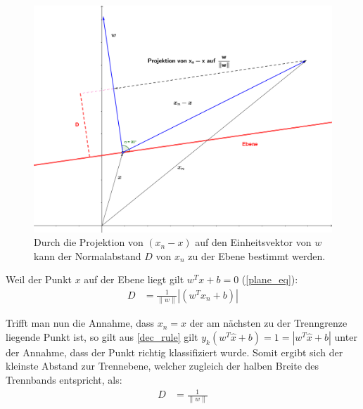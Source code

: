 \documentclass[a4paper,11pt,twoside]{scrreprt}
\newcommand{\norm}[1]{\lVert#1\rVert}
\begin{document}
\begin{figure}[H]
	\centering
	\includegraphics[width = 13cm]{assets/projection.png}
	\caption{Durch die Projektion von $(x_{n} - x)$ auf den Einheitsvektor von $w$ kann der Normalabstand $D$ von $x_{n}$ zu der Ebene bestimmt werden.}
	\label{fig:projection}
\end{figure}

Weil der Punkt $x$ auf der Ebene liegt gilt $w^{T} x + b = 0$ (\autoref{plane_eq}):
\begin{equation} \label{distance_to_plane_simplified1}
	\begin{aligned}
		D &= \frac{1}{\norm{w}} | (w^{T} x_{n} + b) |
	\end{aligned}
\end{equation}

Trifft man nun die Annahme, dass $x_{n} = \hat{x}$ der am nächsten zu der Trenngrenze liegende Punkt ist, so gilt aus \autoref{dec_rule} gilt $y_{k} (w^{T} \hat{x} + b) = 1 = |w^{T} \hat{x} + b|$ unter der Annahme, dass der Punkt richtig klassifiziert wurde. Somit ergibt sich der kleinste Abstand zur Trennebene, welcher zugleich der halben Breite des Trennbands entspricht, als:
\begin{equation} \label{distance_to_plane_simplified2}
	\begin{aligned}
		D &= \frac{1}{\norm{w}}
	\end{aligned}
\end{equation}
\end{document}
